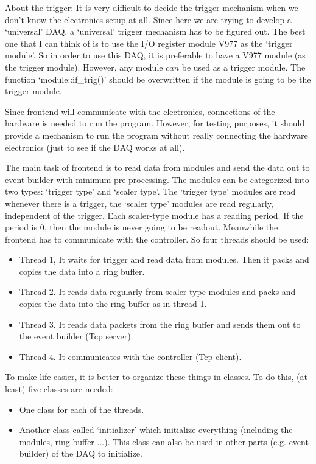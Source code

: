 \documentclass[a4paper,12pt]{article}
\begin{document}
	About the trigger: It is very difficult to decide the trigger mechanism
	when we don't know the electronics setup at all. Since here we are
	trying to develop a `universal' DAQ, a `universal' trigger mechanism has
	to be figured out. The best one that I can think of is to use the I/O
	register module V977 as the `trigger module'. So in order to use this
	DAQ, it is preferable to have a V977 module (as the trigger module).
	However, any module $can$ be used as a trigger module. The function
	`module::if\_trig()' should be overwritten if the module is going to be
	the trigger module.

	Since frontend will communicate with the electronics, connections of the
	hardware is needed to run the program. However, for testing purposes, it
	should provide a mechanism to run the program without really connecting
	the hardware electronics (just to see if the DAQ works at all).
	
	The main task of frontend is to read data from modules and send the data
	out to event builder with minimum pre-processing. The modules can be
	categorized into two types: `trigger type' and `scaler type'. The
	`trigger type' modules are read whenever there is a trigger, the `scaler
	type' modules are read regularly, independent of the trigger. Each
	scaler-type module has a reading period. If the period is 0, then the
	module is never going to be readout. Meanwhile the frontend has to
	communicate with the controller. So four threads should be used:
	\begin{itemize}
		\item Thread 1,  It waits for trigger and read data from modules.
			Then it packs and copies the data into a ring buffer.
		\item Thread 2. It reads data regularly from scaler type modules and
			packs and copies the data into the ring buffer as in thread 1.
		\item Thread 3. It reads data packets from the ring buffer and sends
			them out to the event builder (Tcp server).
		\item Thread 4. It communicates with the controller (Tcp client).
	\end{itemize}

	To make life easier, it is better to organize these things in classes.
	To do this, (at least) five classes are needed:
	\begin{itemize}
		\item One class for each of the threads.
		\item Another class called `initializer' which initialize everything
			(including the modules, ring buffer ...). This class can also be
			used in other parts (e.g. event builder) of the DAQ to
			initialize.
	\end{itemize}
\end{document}

